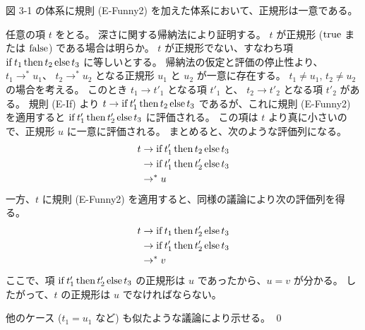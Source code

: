 \begin{jtheorem}[正規形の一意性]
  図 3-1 の体系に規則 (E-Funny2) を加えた体系において、正規形は一意である。
\end{jtheorem}
\begin{jproof}
  任意の項 $t$ をとる。
  深さに関する帰納法により証明する。
  $t$ が正規形 ($\operatorname{true}$ または $\operatorname{false}$) である場合は明らか。
  $t$ が正規形でない、すなわち項 $\operatorname{if} t_1 \operatorname{then} t_2 \operatorname{else} t_3$ に等しいとする。
  帰納法の仮定と評価の停止性より、
    $t_1 \to^* u_1$、
    $t_2 \to^* u_2$
  となる正規形 $u_1$ と $u_2$ が一意に存在する。
  $t_1 \not= u_1$, $t_2 \not= u_2$ の場合を考える。
  このとき
    $t_1 \to t'_1$ となる項 $t'_1$ と、
    $t_2 \to t'_2$ となる項 $t'_2$
  がある。
  規則 (E-If) より $t \to \operatorname{if} t'_1 \operatorname{then} t_2 \operatorname{else} t_3$ であるが、これに規則 (E-Funny2) を適用すると $\operatorname{if} t'_1 \operatorname{then} t'_2 \operatorname{else} t_3$ に評価される。
  この項は $t$ より真に小さいので、正規形 $u$ に一意に評価される。
  まとめると、次のような評価列になる。
  \begin{align*}
    t
    & \to \operatorname{if} t'_1 \operatorname{then} t_2 \operatorname{else} t_3
    \\ & \to \operatorname{if} t'_1 \operatorname{then} t'_2 \operatorname{else} t_3
    \\ & \to^* u
  \end{align*}
  一方、$t$ に規則 (E-Funny2) を適用すると、同様の議論により次の評価列を得る。
  \begin{align*}
    t
    & \to \operatorname{if} t_1 \operatorname{then} t'_2 \operatorname{else} t_3
    \\ & \to \operatorname{if} t'_1 \operatorname{then} t'_2 \operatorname{else} t_3
    \\ & \to^* v
  \end{align*}
  ここで、項 $\operatorname{if} t'_1 \operatorname{then} t'_2 \operatorname{else} t_3$ の正規形は $u$ であったから、$u = v$ が分かる。
  したがって、$t$ の正規形は $u$ でなければならない。

  他のケース ($t_1 = u_1$ など) も似たような議論により示せる。
  \qed
\end{jproof}
